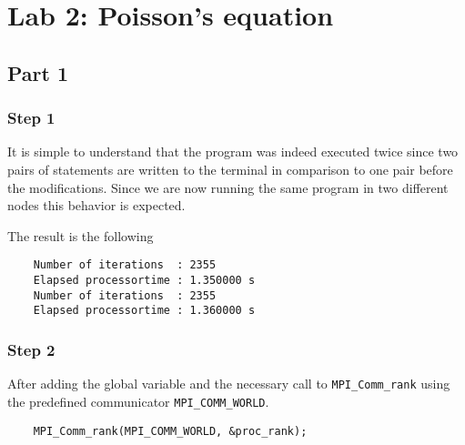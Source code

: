 \section{Lab 2: Poisson's equation}


\subsection{Part 1}
\subsubsection{Step 1}

It is simple to understand that the program was indeed executed twice since two pairs of statements are written to the terminal in comparison to one pair before the modifications. Since we are now running the same program in two different nodes this behavior is expected.  

The result is the following
\begin{lstlisting}
	Number of iterations  : 2355
	Elapsed processortime : 1.350000 s
	Number of iterations  : 2355
	Elapsed processortime : 1.360000 s
\end{lstlisting}

\subsubsection{Step 2}

After adding the global variable and the necessary call to \texttt{MPI\_Comm\_rank} using the predefined communicator \texttt{MPI\_COMM\_WORLD}.
\begin{lstlisting}
	MPI_Comm_rank(MPI_COMM_WORLD, &proc_rank);
\end{lstlisting}

